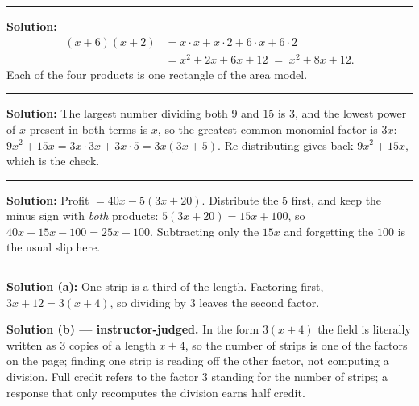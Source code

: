 \documentclass[12pt]{article}
\begin{document}
\vspace{0.15cm}\noindent\rule{\linewidth}{0.2pt}


\textbf{Solution:}
\begin{align*}
  (x+6)(x+2) &= x\cdot x + x\cdot 2 + 6\cdot x + 6\cdot 2\\
             &= x^2 + 2x + 6x + 12 \;=\; x^2 + 8x + 12.
\end{align*}
Each of the four products is one rectangle of the area model. 

\vspace{0.15cm}\noindent\rule{\linewidth}{0.2pt}


\textbf{Solution:} \quad The largest number dividing both $9$ and $15$ is $3$, and the lowest power
of $x$ present in both terms is $x$, so the greatest common monomial factor is $3x$:
$9x^2 + 15x = 3x\cdot 3x + 3x\cdot 5 = 3x(3x + 5)$. Re-distributing gives back
$9x^2 + 15x$, which is the check. 

\vspace{0.15cm}\noindent\rule{\linewidth}{0.2pt}


\textbf{Solution:} \quad Profit $= 40x - 5(3x + 20)$. Distribute the $5$ first, and keep the minus
sign with \emph{both} products: $5(3x + 20) = 15x + 100$, so
$40x - 15x - 100 = 25x - 100$. Subtracting only the $15x$ and forgetting the $100$ is the usual
slip here. 

\vspace{0.15cm}\noindent\rule{\linewidth}{0.2pt}


\textbf{Solution (a):} \quad One strip is a third of the length. Factoring first,
$3x + 12 = 3(x + 4)$, so dividing by $3$ leaves the second factor. 

\noindent\textbf{Solution (b) --- instructor-judged.} In the form $3(x + 4)$ the field is literally
written as $3$ copies of a length $x + 4$, so the number of strips is one of the factors on the
page; finding one strip is reading off the other factor, not computing a division. Full credit
refers to the factor $3$ standing for the number of strips; a response that only recomputes the
division earns half credit.
\end{document}
